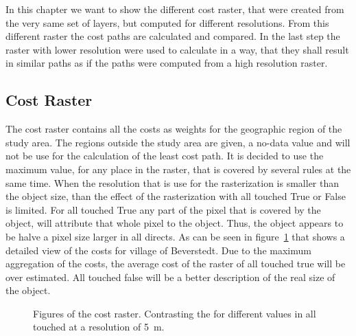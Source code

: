 
In this chapter we want to show the different cost raster, that were created from the very same set of layers,
but computed for different resolutions.
From this different raster the cost paths are calculated and compared.
In the last step the raster with lower resolution were used to calculate in a way, that they shall result in
similar paths as if the paths were computed from a high resolution raster.

\subsection{Cost Raster}\label{subsec:cost-raster}

The cost raster contains all the costs as weights for the geographic region of the study area.
The regions outside the study area are given, a no-data value and will not be use for the calculation of the least cost path.
It is decided to use the maximum value, for any place in the raster, that is covered by several rules at the same time.
When the resolution that is use for the rasterization is smaller than the object size, than the effect of the rasterization with all touched True or False is limited.
For all touched True any part of the pixel that is covered by the object, will attribute that whole pixel to the object.
Thus, the object appears to be halve a pixel size larger in all directs.
As can be seen in figure~\ref{fig:costs_5m} that shows a detailed view of the costs for village of Beverstedt.
Due to the maximum aggregation of the costs, the average cost of the raster of all touched true will be over estimated.
All touched false will be a better description of the real size of the object.
\begin{figure}
	\centering

	\qquad
	\caption{Figures of the cost raster. Contrasting the for different values in all touched at a resolution of 5~m.}
	\label{fig:costs_5m}
\end{figure}

